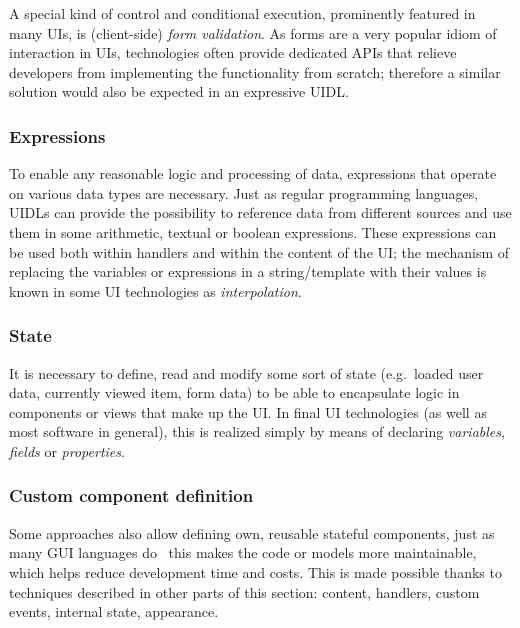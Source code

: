A special kind of control and conditional execution, prominently featured in many UIs, is (client-side) \emph{form validation}.
As forms are a very popular idiom of interaction in UIs, technologies often provide dedicated APIs that relieve developers from implementing the functionality from scratch;
therefore a similar solution would also be expected in an expressive UIDL\@.

\subsubsection{Expressions}
To enable any reasonable logic and processing of data, expressions that operate on various data types are necessary.
Just as regular programming languages, UIDLs can provide the possibility to reference data from different sources and use them in some arithmetic, textual or boolean expressions.
These expressions can be used both within handlers and within the content of the UI;
the mechanism of replacing the variables or expressions in a string/template with their values is known in some UI technologies as \emph{interpolation}.

\subsubsection{State}
It is necessary to define, read and modify some sort of state (e.g.\ loaded user data, currently viewed item, form data) to be able to encapsulate logic in components or views that make up the UI\@.
In final UI technologies (as well as most software in general), this is realized simply by means of declaring \emph{variables}, \emph{fields} or \emph{properties}.

\subsubsection{Custom component definition}
Some approaches also allow defining own, reusable stateful components, just as many GUI languages do \textendash\ this makes the code or models more maintainable, which helps reduce development time and costs.
This is made possible thanks to techniques described in other parts of this section: content, handlers, custom events, internal state, appearance.

